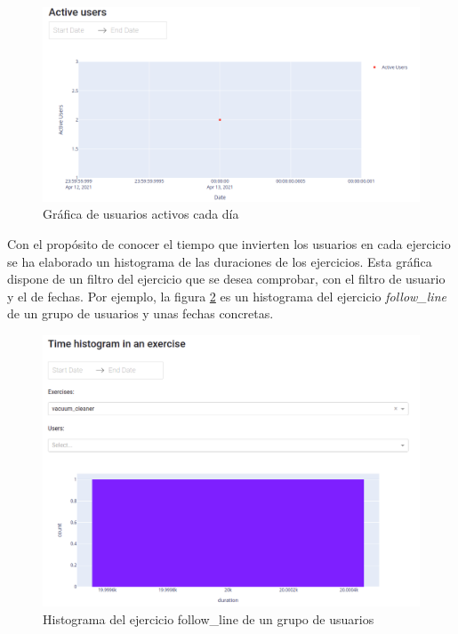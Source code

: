\begin{figure}[H]
    \centering
    \includegraphics[width=17cm, keepaspectratio]{img/active.png}
    \caption{Gráfica de usuarios activos cada día}
    \label{fig:active}
\end{figure}
\newpage
Con el propósito de conocer el tiempo que invierten los usuarios en cada ejercicio se ha elaborado un histograma de las duraciones de los ejercicios. Esta gráfica dispone de un filtro del ejercicio que se desea comprobar, con el filtro de usuario y el de fechas. Por ejemplo, la figura \ref{fig:histogram_exercise} es un histograma del ejercicio \textit{follow\_line}  de un grupo de usuarios y unas fechas concretas.
\begin{figure}[H]
    \centering
    \includegraphics[width=17cm, keepaspectratio]{img/histogram_exercise.png}
    \caption{Histograma del ejercicio follow\_line de un grupo de usuarios }
    \label{fig:histogram_exercise}
\end{figure}
\newpage

